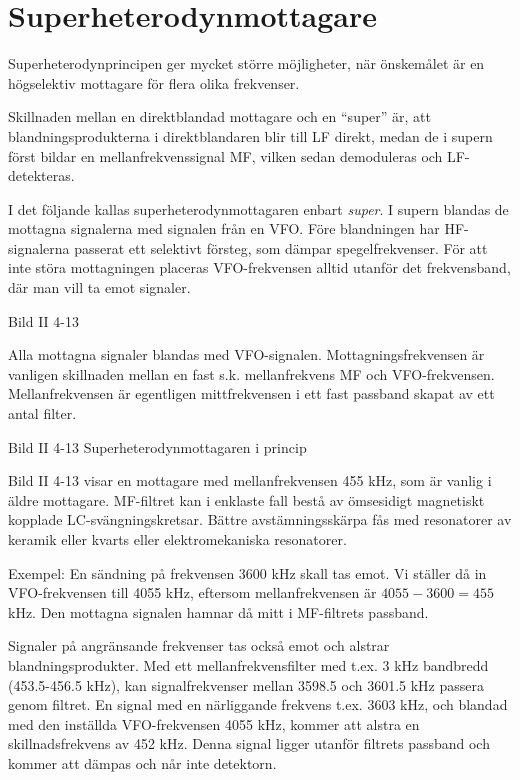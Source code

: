 \section{Superheterodynmottagare}

Superheterodynprincipen ger mycket större möjligheter, när önskemålet
är en högselektiv mottagare för flera olika frekvenser.

Skillnaden mellan en direktblandad mottagare och en ``super'' är, att
blandningsprodukterna i direktblandaren blir till LF direkt, medan de
i supern först bildar en mellanfrekvenssignal MF, vilken sedan
demoduleras och LF-detekteras.

I det följande kallas superheterodynmottagaren enbart \emph{super}. I
supern blandas de mottagna signalerna med signalen från en VFO. Före
blandningen har HF-signalerna passerat ett selektivt försteg, som
dämpar spegelfrekvenser. För att inte störa mottagningen placeras
VFO-frekvensen alltid utanför det frekvensband, där man vill ta emot
signaler.

Bild II 4-13

Alla mottagna signaler blandas med VFO-signalen. Mottagningsfrekvensen
är vanligen skillnaden mellan en fast s.k. mellanfrekvens MF och
VFO-frekvensen. Mellanfrekvensen är egentligen mittfrekvensen i ett
fast passband skapat av ett antal filter.

Bild II 4-13 Superheterodynmottagaren i princip

Bild II 4-13 visar en mottagare med mellanfrekvensen 455 kHz, som är
vanlig i äldre mottagare. MF-filtret kan i enklaste fall bestå av
ömsesidigt magnetiskt kopplade LC-svängningskretsar. Bättre
avstämningsskärpa fås med resonatorer av keramik eller kvarts eller
elektromekaniska resonatorer.

Exempel: En sändning på frekvensen 3600 kHz skall tas emot. Vi ställer
då in VFO-frekvensen till 4055 kHz, eftersom mellanfrekvensen är
\(4055 - 3600 = 455\) kHz. Den mottagna signalen hamnar då mitt i
MF-filtrets passband.

Signaler på angränsande frekvenser tas också emot och alstrar
blandningsprodukter.  Med ett mellanfrekvensfilter med t.ex. 3 kHz
bandbredd (453.5-456.5 kHz), kan signalfrekvenser mellan 3598.5 och
3601.5 kHz passera genom filtret. En signal med en närliggande
frekvens t.ex. 3603 kHz, och blandad med den inställda VFO-frekvensen
4055 kHz, kommer att alstra en skillnadsfrekvens av 452 kHz. Denna
signal ligger utanför filtrets passband och kommer att dämpas och når
inte detektorn.

